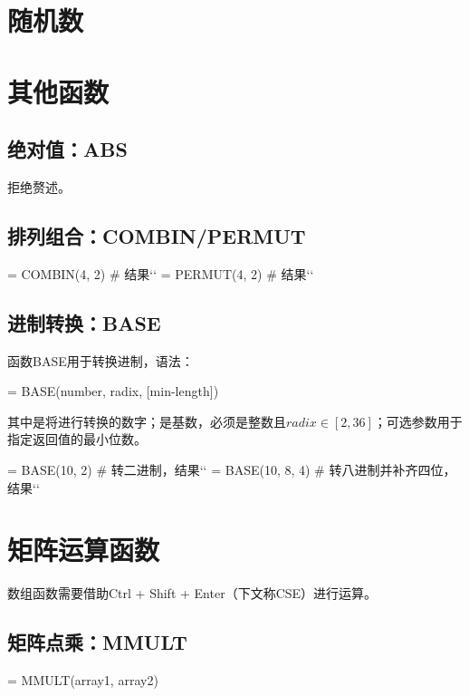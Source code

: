 \section{随机数}

\section{其他函数}
\subsection{绝对值：ABS}
拒绝赘述。

\subsection{排列组合：COMBIN/PERMUT}
\begin{excode}
= COMBIN(4, 2)  # 结果``
= PERMUT(4, 2)  # 结果``
\end{excode}

\subsection{进制转换：BASE}
函数BASE用于转换进制，语法：
\begin{syntax}
= BASE(number, radix, [min-length])
\end{syntax}

其中是将进行转换的数字；是基数，必须是整数且$radix\in [2, 36]$；可选参数用于指定返回值的最小位数。

\begin{excode}
= BASE(10, 2)  # 转二进制，结果``
= BASE(10, 8, 4)  # 转八进制并补齐四位，结果``
\end{excode}

\section{矩阵运算函数}
数组函数需要借助Ctrl + Shift + Enter（下文称CSE）进行运算。

\subsection{矩阵点乘：MMULT}
\begin{syntax}
= MMULT(array1, array2)
\end{syntax}

